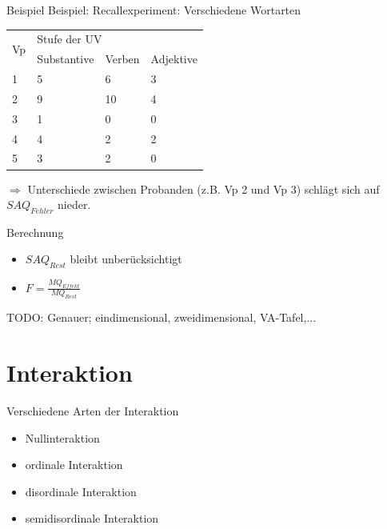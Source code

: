 \documentclass{beamer}
\begin{document}
	\begin{frame}{Beispiel}
		Beispiel: Recallexperiment: Verschiedene Wortarten
		\begin{table}[]
			\centering
			\begin{tabular}{|l|l|l|l|}
				\hline
				\multirow{2}{*}{Vp} & \multicolumn{3}{l|}{Stufe der UV} \\
				& Substantive  & Verben & Adjektive \\ \hline
				1                   & 5            & 6      & 3         \\ \hline
				2                   & 9            & 10     & 4         \\ \hline
				3                   & 1            & 0      & 0         \\ \hline
				4                   & 4            & 2      & 2         \\ \hline
				5                   & 3            & 2      & 0         \\ \hline
			\end{tabular}
		\end{table}
		$\Rightarrow$ Unterschiede zwischen Probanden (z.B. Vp 2 und Vp 3) schlägt sich auf $SAQ_{Fehler}$ nieder.
	\end{frame}
	
	\begin{frame}{Berechnung}
		\begin{itemize}
			\item $SAQ_{Rest}$ bleibt unberücksichtigt
			\item $F = \frac{MQ_{Effekt}}{MQ_{Rest}}$
		\end{itemize}
		\alert{TODO: Genauer; eindimensional, zweidimensional, VA-Tafel,... }
	\end{frame}
	
	\section{Interaktion}
	
	\begin{frame}{Verschiedene Arten der Interaktion}
		\begin{itemize}
			\item Nullinteraktion
			\item ordinale Interaktion
			\item disordinale Interaktion
			\item semidisordinale Interaktion
		\end{itemize}
	\end{frame}
	
\end{document}
